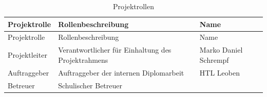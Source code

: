 \documentclass[
    headings=optiontotocandhead,%
    twoside,
    numbers=noenddot,%
    12pt, %
    titlepage, %
    parskip=full, %
    listof=leveldown, 
    numbers=noenddot, %
    a4paper,DIV=14,
    BCOR=15mm,
]{scrbook}
\begin{document}
\begin{longtable}[]{@{}lll@{}}
\caption{Projektrollen}\tabularnewline
\toprule
\begin{minipage}[b]{0.23\columnwidth}\raggedright
Projektrolle\strut
\end{minipage} & \begin{minipage}[b]{0.50\columnwidth}\raggedright
Rollenbeschreibung\strut
\end{minipage} & \begin{minipage}[b]{0.18\columnwidth}\raggedright
Name\strut
\end{minipage}\tabularnewline
\midrule
\endfirsthead
\toprule
\begin{minipage}[b]{0.23\columnwidth}\raggedright
Projektrolle\strut
\end{minipage} & \begin{minipage}[b]{0.50\columnwidth}\raggedright
Rollenbeschreibung\strut
\end{minipage} & \begin{minipage}[b]{0.18\columnwidth}\raggedright
Name\strut
\end{minipage}\tabularnewline
\midrule
\endhead
\begin{minipage}[t]{0.23\columnwidth}\raggedright
Projektleiter\strut
\end{minipage} & \begin{minipage}[t]{0.50\columnwidth}\raggedright
Verantwortlicher für Einhaltung des Projektrahmens\strut
\end{minipage} & \begin{minipage}[t]{0.18\columnwidth}\raggedright
Marko Daniel Schrempf\strut
\end{minipage}\tabularnewline
\begin{minipage}[t]{0.23\columnwidth}\raggedright
Auftraggeber\strut
\end{minipage} & \begin{minipage}[t]{0.50\columnwidth}\raggedright
Auftraggeber der internen Diplomarbeit\strut
\end{minipage} & \begin{minipage}[t]{0.18\columnwidth}\raggedright
HTL Leoben\strut
\end{minipage}\tabularnewline
\begin{minipage}[t]{0.23\columnwidth}\raggedright
Betreuer\strut
\end{minipage} & \begin{minipage}[t]{0.50\columnwidth}\raggedright
Schulischer Betreuer\strut
\end{minipage} & \begin{minipage}[t]{0.18\columnwidth}\raggedright

\end{minipage}
\end{longtable}
\end{document}
